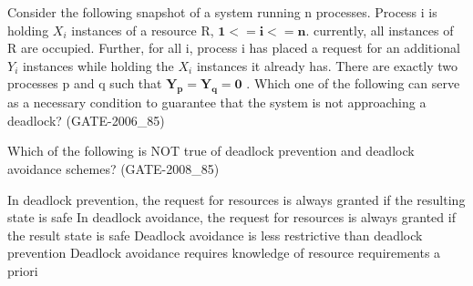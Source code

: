
\begin{questyle}

  \question  Consider the following snapshot of a system running n processes. Process i is holding \(X_i\) instances of a resource R, \( \mathbf{ 1 <= i <= n } \). currently, all instances of R are occupied. Further, for all i, process i has placed a request for an additional \(Y_i\) instances while holding the \(X_i\) instances it already has. There are exactly two processes p and q such that \( \mathbf{ Y_p = Y_q = 0 } \) . Which one of the following can serve as a necessary condition to guarantee that the system is not approaching a deadlock? (GATE-2006\_85)

  \begin{choices}
  \end{choices}

  \end{questyle}




\begin{questyle}

  \question  Which of the following is NOT true of deadlock prevention and deadlock avoidance schemes? (GATE-2008\_85)

  \begin{choices}
    \correctchoice  In deadlock prevention, the request for resources is always granted if the resulting state is safe
    \choice  In deadlock avoidance, the request for resources is always granted if the result state is safe
    \choice  Deadlock avoidance is less restrictive than deadlock prevention
    \choice  Deadlock avoidance requires knowledge of resource requirements a priori
  \end{choices}

  \end{questyle}




